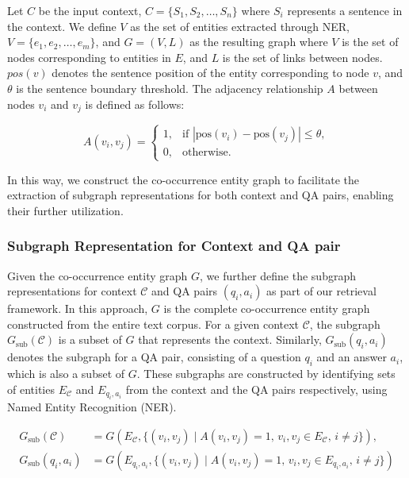 \documentclass[11pt]{article}
\begin{document}
Let \( C \) be the input context, \( C = \{S_1, S_2, \ldots, S_n\} \) where \( S_i \) represents a sentence in the context. We define \( V \) as the set of entities extracted through NER, \( V = \{e_1, e_2, \ldots, e_m\} \), and \( G = (V, L) \) as the resulting graph where \( V \) is the set of nodes corresponding to entities in \( E \), and \( L \) is the set of links between nodes. \( pos(v) \) denotes the sentence position of the entity corresponding to node \( v \), and \( \theta \) is the sentence boundary threshold. The adjacency relationship \( A \) between nodes \( v_i \) and \( v_j \) is defined as follows:

\begin{equation}
\label{eq:adjacency}
A(v_i, v_j) = 
\begin{cases} 
1, & \text{if } |\text{pos}(v_i) - \text{pos}(v_j)| \leq \theta, \\
0, & \text{otherwise.}
\end{cases}
\end{equation}

In this way, we construct the co-occurrence entity graph to facilitate the extraction of subgraph representations for both context and QA pairs, enabling their further utilization.

\subsubsection{Subgraph Representation for Context and QA pair}
Given the co-occurrence entity graph \( G \), we further define the subgraph representations for context \( \mathcal{C} \) and QA pairs \( (q_i, a_i) \) as part of our retrieval framework. In this approach, \( G \) is the complete co-occurrence entity graph constructed from the entire text corpus. For a given context \( \mathcal{C} \), the subgraph \( G_{\text{sub}}(\mathcal{C}) \) is a subset of \( G \) that represents the context. Similarly, \( G_{\text{sub}}(q_i, a_i) \) denotes the subgraph for a QA pair, consisting of a question \( q_i \) and an answer \( a_i \), which is also a subset of \( G \). These subgraphs are constructed by identifying sets of entities \( E_{\mathcal{C}} \) and \( E_{q_i, a_i} \) from the context and the QA pairs respectively, using Named Entity Recognition (NER).

\begin{align}
\label{eq:subgraph_con}
G_{\text{sub}}(\mathcal{C}) &= G(E_{\mathcal{C}}, \{(v_i, v_j) \mid A(v_i, v_j) = 1, \, v_i, v_j \in E_{\mathcal{C}}, \, i \neq j\}), \\
\label{eq:subgraph_qa}
G_{\text{sub}}(q_i, a_i) &= G(E_{q_i, a_i}, \{(v_i, v_j) \mid A(v_i, v_j) = 1, \, v_i, v_j \in E_{q_i, a_i}, \, i \neq j\})
\end{align}
\end{document}
